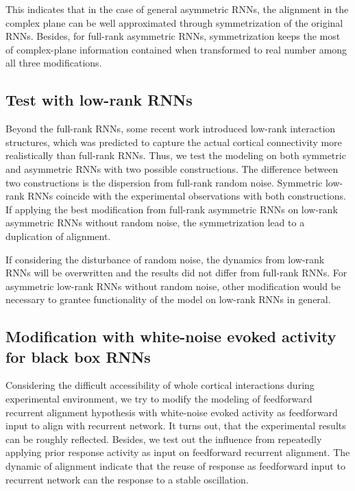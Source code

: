 \documentclass[11pt]{article}
\begin{document}
	This indicates that in the case of general asymmetric RNNs, the alignment in the complex plane can be well approximated through symmetrization of the original RNNs. Besides, for full-rank asymmetric RNNs, symmetrization keeps the most of complex-plane information contained when transformed to real number among all three modifications. 
	
	\subsection*{Test with low-rank RNNs}
	Beyond the full-rank RNNs, some recent work \cite{mastrogiuseppe2018linking, beiran2021shaping, dubreuil2022role} introduced low-rank interaction structures, which was predicted to capture the actual cortical connectivity more realistically than full-rank RNNs. Thus, we test the modeling on both symmetric and asymmetric RNNs with two possible constructions. The difference between two constructions is the dispersion from full-rank random noise. Symmetric low-rank RNNs coincide with the experimental observations with both constructions. If applying the best modification from full-rank asymmetric RNNs on low-rank asymmetric RNNs without random noise, the symmetrization lead to a duplication of alignment. 
	
	If considering the disturbance of random noise, the dynamics from low-rank RNNs will be overwritten and the results did not differ from full-rank RNNs. For asymmetric low-rank RNNs without random noise, other modification would be necessary to grantee functionality of the model on low-rank RNNs in general.  
	
	\subsection*{Modification with white-noise evoked activity for black box RNNs}
	Considering the difficult accessibility of whole cortical interactions during experimental environment, we try to modify the modeling of feedforward recurrent alignment hypothesis with white-noise evoked activity as feedforward input to align with recurrent network. It turns out, that the experimental results can be roughly reflected. Besides, we test out the influence from repeatedly applying prior response activity as input on feedforward recurrent alignment. The dynamic of alignment indicate that the reuse of response as feedforward input to recurrent network can the response to a stable oscillation. 
	
\end{document}
